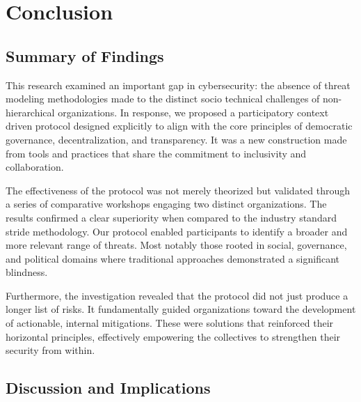 
%

\chapter{Conclusion}
\label{cha:conclusion}

\glsresetall

\section{Summary of Findings}
\label{sec:summary-of-findings}

This research examined an important gap in cybersecurity: the
absence of threat modeling methodologies made to the distinct
socio technical challenges of non-hierarchical organizations. In response, we
proposed a participatory context driven protocol designed explicitly to
align with the core principles of democratic governance, decentralization, and
transparency. It was a new construction made from tools and practices that share
the commitment to inclusivity and collaboration.

The effectiveness of the protocol was not merely theorized but validated through
a series of comparative workshops engaging two distinct organizations. The
results confirmed a clear superiority when compared to the industry standard
\gls{stride} methodology. Our protocol enabled participants to identify a broader and
more relevant range of threats. Most notably those rooted in social,
governance, and political domains where traditional approaches
demonstrated a significant blindness.

Furthermore, the investigation revealed that the protocol did not just produce a
longer list of risks. It fundamentally guided organizations toward the
development of actionable, internal mitigations. These were solutions that
reinforced their horizontal principles, effectively
empowering the collectives to strengthen their security from within.

\section{Discussion and Implications}
\label{sec:discussion-and-implications}

